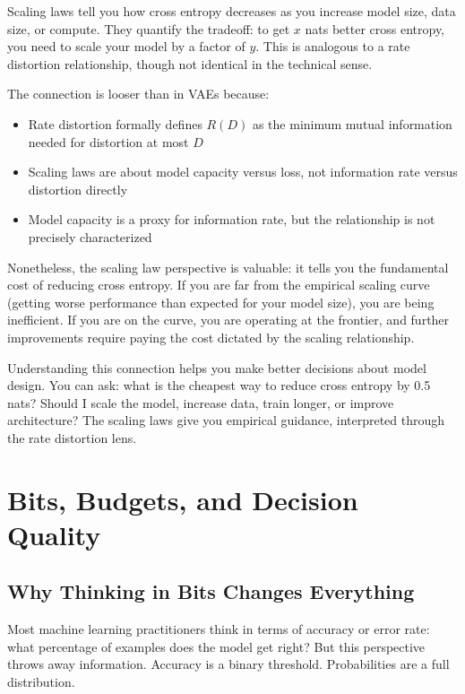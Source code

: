 Scaling laws tell you how cross entropy decreases as you increase model size, data size, or compute. They quantify the tradeoff: to get $x$ nats better cross entropy, you need to scale your model by a factor of $y$. This is analogous to a rate distortion relationship, though not identical in the technical sense.

The connection is looser than in VAEs because:

\begin{itemize}
\item Rate distortion formally defines $R(D)$ as the minimum mutual information needed for distortion at most $D$
\item Scaling laws are about model capacity versus loss, not information rate versus distortion directly
\item Model capacity is a proxy for information rate, but the relationship is not precisely characterized
\end{itemize}

Nonetheless, the scaling law perspective is valuable: it tells you the fundamental cost of reducing cross entropy. If you are far from the empirical scaling curve (getting worse performance than expected for your model size), you are being inefficient. If you are on the curve, you are operating at the frontier, and further improvements require paying the cost dictated by the scaling relationship.

Understanding this connection helps you make better decisions about model design. You can ask: what is the cheapest way to reduce cross entropy by 0.5 nats? Should I scale the model, increase data, train longer, or improve architecture? The scaling laws give you empirical guidance, interpreted through the rate distortion lens.

\vspace{2em}

\section{Bits, Budgets, and Decision Quality}

\subsection{Why Thinking in Bits Changes Everything}

Most machine learning practitioners think in terms of accuracy or error rate: what percentage of examples does the model get right? But this perspective throws away information. Accuracy is a binary threshold. Probabilities are a full distribution.

